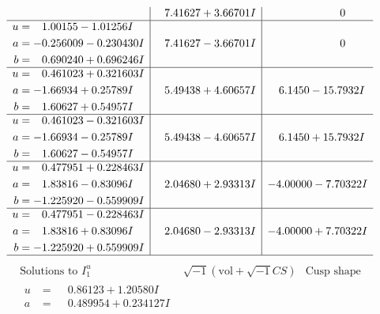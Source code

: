 \documentclass[1p]{elsarticle_modified}
\theoremstyle{definition}
\newcommand{\I}{\sqrt{-1}}
\begin{document}
$$\begin{array}{c|c|c}
 & \phantom{-}7.41627 + 3.66701 I & \phantom{-0.000000 } 0 \\ \hline\begin{aligned}
u &= \phantom{-}1.00155 - 1.01256 I \\
a &= -0.256009 - 0.230430 I \\
b &= \phantom{-}0.690240 + 0.696246 I\end{aligned}
 & \phantom{-}7.41627 - 3.66701 I & \phantom{-0.000000 } 0 \\ \hline\begin{aligned}
u &= \phantom{-}0.461023 + 0.321603 I \\
a &= -1.66934 + 0.25789 I \\
b &= \phantom{-}1.60627 + 0.54957 I\end{aligned}
 & \phantom{-}5.49438 + 4.60657 I & \phantom{-}6.1450 - 15.7932 I \\ \hline\begin{aligned}
u &= \phantom{-}0.461023 - 0.321603 I \\
a &= -1.66934 - 0.25789 I \\
b &= \phantom{-}1.60627 - 0.54957 I\end{aligned}
 & \phantom{-}5.49438 - 4.60657 I & \phantom{-}6.1450 + 15.7932 I \\ \hline\begin{aligned}
u &= \phantom{-}0.477951 + 0.228463 I \\
a &= \phantom{-}1.83816 - 0.83096 I \\
b &= -1.225920 - 0.559909 I\end{aligned}
 & \phantom{-}2.04680 + 2.93313 I & -4.00000 - 7.70322 I \\ \hline\begin{aligned}
u &= \phantom{-}0.477951 - 0.228463 I \\
a &= \phantom{-}1.83816 + 0.83096 I \\
b &= -1.225920 + 0.559909 I\end{aligned}
 & \phantom{-}2.04680 - 2.93313 I & -4.00000 + 7.70322 I\\
 \hline 
 \end{array}$$\newpage$$\begin{array}{c|c|c}  
\text{Solutions to }I^u_{1}& \I (\text{vol} + \sqrt{-1}CS) & \text{Cusp shape}\\
 \hline 
\begin{aligned}
u &= \phantom{-}0.86123 + 1.20580 I \\
a &= \phantom{-}0.489954 + 0.234127 I \\

\end{aligned}
\end{array}$$
\end{document}
